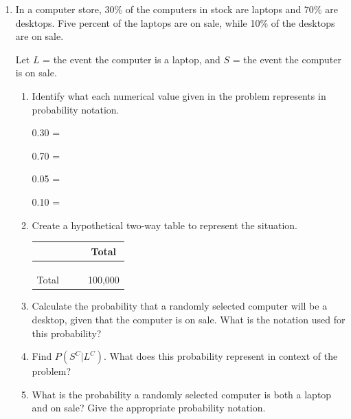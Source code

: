 \documentclass[
]{report}
\begin{document}
\begin{enumerate}
\def\labelenumi{\arabic{enumi}.}
\setcounter{enumi}{5}
\item
  In a computer store, 30\% of the computers in stock are laptops and 70\% are desktops. Five percent of the laptops are on sale, while 10\% of the desktops are on sale.
  \vspace{1mm}

  Let \(L\) = the event the computer is a laptop, and \(S\) = the event the computer is on sale.
  \vspace{0.1in}

  \begin{enumerate}
  \def\labelenumii{\alph{enumii}.}
  \item
    Identify what each numerical value given in the problem represents in probability notation.
    \vspace{.1in}

    0.30 =\\
    \vspace{.1in}

    0.70 =\\
    \vspace{.1in}

    0.05 =\\
    \vspace{.1in}

    0.10 =\\
    \vspace{.1in}
  \item
    Create a hypothetical two-way table to represent the situation.\\

    \renewcommand{\arraystretch}{1.5}
    \begin{center}
    \begin{tabular}{cccc} \hline
    \hspace{1in} & \hspace{1in} & \hspace{1in} & Total \\ \hline
    & & & \\ 
    & & & \\ 
    & & & \\ \hline
    Total & & & 100,000 \\ \hline
    \end{tabular}
    \end{center}
    \vspace{.1in}
  \item
    Calculate the probability that a randomly selected computer will be a desktop, given that the computer is on sale. What is the notation used for this probability?
    \vspace{.8in}
  \item
    Find \(P(S^C | L^C)\). What does this probability represent in context of the problem?
    \vspace{1in}
  \item
    What is the probability a randomly selected computer is both a laptop and on sale? Give the appropriate probability notation.
  \end{enumerate}
\end{enumerate}
\end{document}
